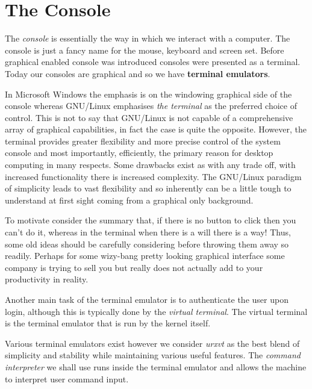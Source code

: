 
\section{The Console} %
\label{sec:console}

The \emph{console} is essentially the way in which we interact
with a computer. The console is just a fancy name for the mouse,
keyboard and screen set. Before graphical enabled console was
introduced consoles were presented as a terminal. Today our
consoles are graphical and so we have \textbf{terminal emulators}.

In Microsoft Windows the emphasis is on the windowing graphical
side of the console whereas GNU/Linux emphasises \emph{the terminal}
as the preferred choice of control. This is not to say that
GNU/Linux is not capable of a comprehensive array of graphical
capabilities, in fact the case is quite the opposite. However,
the terminal provides greater flexibility and more precise control
of the system console and most importantly, efficiently, the
primary reason for desktop computing in many respects. Some
drawbacks exist as with any trade off, with increased functionality
there is increased complexity. The GNU/Linux paradigm of simplicity
leads to vast flexibility and so inherently can be a little tough
to understand at first sight coming from a graphical only background.

To motivate consider the summary that, if there is no button to click
then you can't do it, whereas in the terminal when there is a will
there is a way! Thus, some old ideas should be carefully considering
before throwing them away so readily. Perhaps for some wizy-bang pretty
looking graphical interface some company is trying to sell you but really
does not actually add to your productivity in reality. 

Another main task of the terminal emulator is to authenticate the user
upon login, although this is typically done by the \emph{virtual terminal}.
The virtual terminal is the terminal emulator that is run by the kernel
itself.

Various terminal emulators exist however we consider \emph{urxvt} as
the best blend of simplicity and stability while maintaining various
useful features. The \emph{command interpreter} we shall use runs inside
the terminal emulator and allows the machine to interpret user command input.

